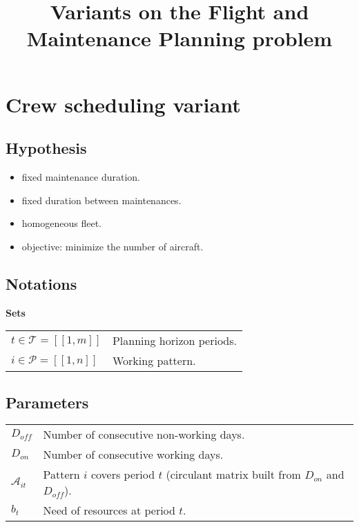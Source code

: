 \documentclass[a4paper,11pt]{article}
\title{Variants on the Flight and Maintenance Planning problem}
\author{}
\begin{document}
\maketitle

\section{Crew scheduling variant}

    \subsection{Hypothesis}

    \begin{itemize}
     \item fixed maintenance duration.
     \item fixed duration between maintenances.
     \item homogeneous fleet.
     \item objective: minimize the number of aircraft.
    \end{itemize}

    \subsection{Notations}

    \textbf{Sets}

    \begin{tabular}{ll}
    $t\in \mathcal{T} = [\![1, m]\!]$ & Planning horizon periods. \\
    $i \in \mathcal{P} = [\![1, n]\!]$ & Working pattern.\\
    \end{tabular}

    \vskip 0.3cm

    \subsection{Parameters}

    \begin{tabular}{ll}
        $D_{off}$ & Number of consecutive non-working days. \\
        $D_{on}$ & Number of consecutive working days. \\
        $\mathcal{A}_{it}$ & Pattern $i$ covers period $t$ (circulant matrix built from $D_{on}$ and $D_{off}$).\\
        $b_{t}$ & Need of resources at period $t$. \\
    \end{tabular}
\end{document}
